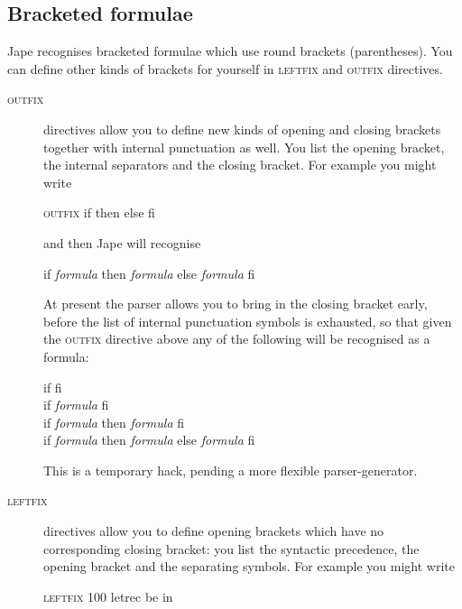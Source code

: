 \subsection{Bracketed formulae}

Jape recognises bracketed formulae which use round brackets (parentheses). You can define other kinds of brackets for yourself in \textsc{leftfix} and \textsc{outfix} directives.

\begin{description}
\item[\textsc{outfix}]  directives allow you to define new kinds of opening and closing brackets together with internal punctuation as well. You list the opening bracket, the internal separators and the closing bracket. For example you might write

\begin{japeish}
\textsc{outfix} if then else fi
\end{japeish}

and then Jape will recognise

\begin{japeish}
if \textit{formula} then \textit{formula} else \textit{formula} fi
\end{japeish}

At present the parser allows you to bring in the closing bracket early, before the list of internal punctuation symbols is exhausted, so that given the \textsc{outfix} directive above any of the following will be recognised as a formula:

\begin{japeish}
if fi\\
if \textit{formula} fi\\
if \textit{formula} then \textit{formula} fi\\
if \textit{formula} then \textit{formula} else \textit{formula} fi
\end{japeish}

This is a temporary hack, pending a more flexible parser-generator.

\item[\textsc{leftfix}] directives allow you to define opening brackets which have no corresponding closing bracket: you list the syntactic precedence, the opening bracket and the separating symbols. For example you might write

\begin{japeish}
\textsc{leftfix 100} letrec be in
\end{japeish}


\end{description}
